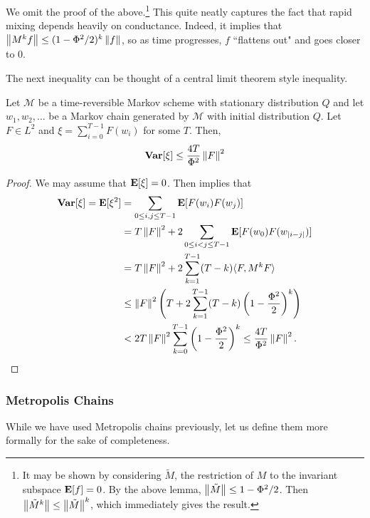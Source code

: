 We omit the proof of the above.\footnote{It may be shown by considering $\tilde{M}$, the restriction of $M$ to the invariant subspace $\textbf{E}[f]=0$. By the above lemma, $\left\lVert\tilde{M}\right\rVert\leq 1-\Phi^2/2$. Then $\left\lVert\tilde{M}^k\right\rVert \leq \left\lVert\tilde{M}\right\rVert^k$, which immediately gives the result.} This quite neatly captures the fact that rapid mixing depends heavily on conductance. Indeed, it implies that $\left\lVert M^k f\right\rVert \leq (1-\Phi^2/2)^k \left\lVert f\right\rVert$, so as time progresses, $f$ ``flattens out" and goes closer to $0$.

The next inequality can be thought of a central limit theorem style inequality.

\begin{theorem}
	\label{bounding variance}
	Let $\mathcal{M}$ be a time-reversible Markov scheme with stationary distribution $Q$ and let $w_1,w_2,\ldots$ be a Markov chain generated by $\mathcal{M}$ with initial distribution $Q$. Let $F\in L^2$ and $\xi = \sum_{i=0}^{T-1}F(w_i)$ for some $T$. Then,
	\[ \operatorname{\textbf{Var}}[\xi] \leq \frac{4T}{\Phi^2}\left\lVert F\right\rVert^2 \]
\end{theorem}
\begin{proof}
	We may assume that $\textbf{E}[\xi] = 0$. Then  implies that
	\begin{align*}
		\operatorname{\textbf{Var}}[\xi] = \textbf{E}[\xi^2] &= \sum_{0\leq i,j\leq T-1} \textbf{E}[F(w_i)F(w_j)] \\
			&= T\left\lVert F\right\rVert^2 + 2 \sum_{0\leq i<j\leq T-1} \textbf{E}[F(w_0)F(w_{|i-j|})] \\
			&= T\left\lVert F\right\rVert^2 + 2 \sum_{k=1}^{T-1} (T-k) \langle F,M^{k}F\rangle \\
			&\leq \left\lVert F\right\rVert^2 \left(T + 2 \sum_{k=1}^{T-1} (T-k)\left(1-\frac{\Phi^2}{2}\right)^k\right) \\
			&< 2T\left\lVert F\right\rVert^2 \sum_{k=0}^{T-1} \left(1-\frac{\Phi^2}{2}\right)^k \leq \frac{4T}{\Phi^2} \left\lVert F\right\rVert^2.
	\end{align*}
\end{proof}

\subsubsection{Metropolis Chains}

While we have used Metropolis chains previously, let us define them more formally for the sake of completeness.

